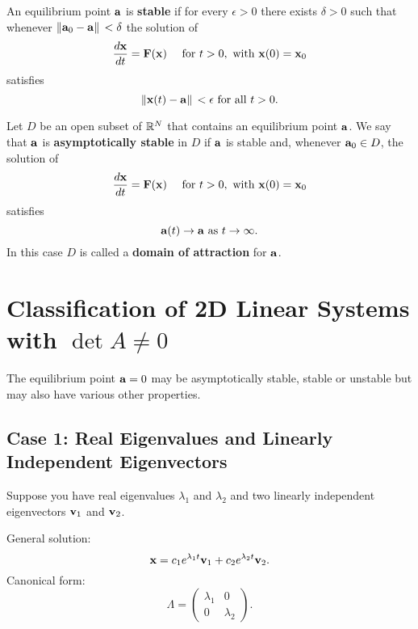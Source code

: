 An equilibrium point \(\mathbf{a}\) is \textbf{stable} if for every \(\epsilon > 0\) there exists \(\delta > 0\) such that whenever \(\norm*{\mathbf{a}_0 - \mathbf{a}} <\delta\) the solution of
\[\frac{d \mathbf{x}}{dt} = \mathbf{F}(\mathbf{x}) \quad  \text{ for } t > 0,  \text{ with } \mathbf{x}(0) = \mathbf{x}_0\]
satisfies
\[\norm*{\mathbf{x}(t) - \mathbf{a}} < \epsilon  \text{ for all } t > 0.\]

Let \(D\) be an open subset of \(\mathbb{R}^N\) that contains an equilibrium point \(\mathbf{a}\). We say that \(\mathbf{a}\) is \textbf{asymptotically stable} in \(D\) if \(\mathbf{a}\) is stable and, whenever \(\mathbf{a}_0 \in D\), the solution of
\[\frac{d \mathbf{x}}{dt} = \mathbf{F}(\mathbf{x}) \quad  \text{ for } t > 0, \text{ with } \mathbf{x}(0) = \mathbf{x}_0\]
satisfies
\[\mathbf{a}(t) \to \mathbf{a}  \text{ as } t \to \infty.\]
In this case \(D\) is called a \textbf{domain of attraction} for \(\mathbf{a}\).


\section{Classification of 2D Linear Systems with \(\det A \neq 0\)}
The equilibrium point \(\mathbf{a} = 0\) may be asymptotically stable, stable or unstable but may also have various other properties.

\subsection{Case 1: Real Eigenvalues and Linearly Independent Eigenvectors}
Suppose you have real eigenvalues \(\lambda_1\) and \(\lambda_2\) and two linearly independent eigenvectors \(\mathbf{v}_1\) and \(\mathbf{v}_2\).

General solution:
\[\mathbf{x} = c_1 e^{\lambda_1 t}\mathbf{v}_1 + c_2 e^{\lambda_2 t}\mathbf{v}_2.\]
Canonical form:
\[\Lambda =
    \begin{pmatrix}
        \lambda_1 & 0         \\
        0         & \lambda_2
    \end{pmatrix}.
\]

